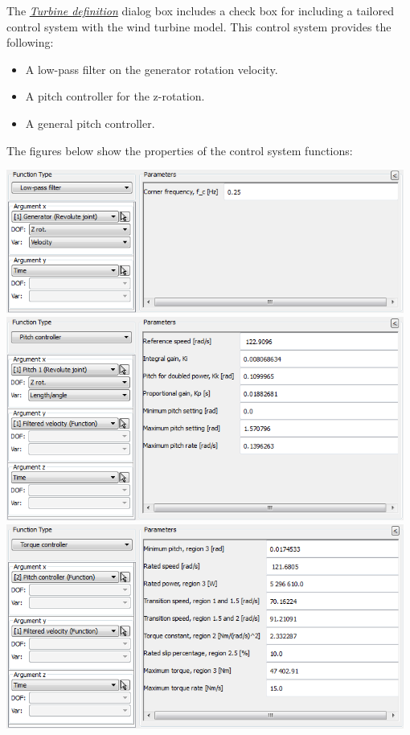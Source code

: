 
The \protect\hyperlink{turbine-definition}{\sl Turbine definition} dialog box
includes a check box for including a tailored control system with the wind
turbine model.
This control system provides the following:

\begin{itemize}
\item A low-pass filter on the generator rotation velocity.
\item A pitch controller for the z-rotation.
\item A general pitch controller.
\end{itemize}

The figures below show the properties of the control system functions:

\clearpage\noindent
\includegraphics[width=0.98\textwidth]{Figures/3b-ControlSysFunc1}
\includegraphics[width=0.98\textwidth]{Figures/3b-ControlSysFunc2}
\includegraphics[width=0.98\textwidth]{Figures/3b-ControlSysFunc3}

